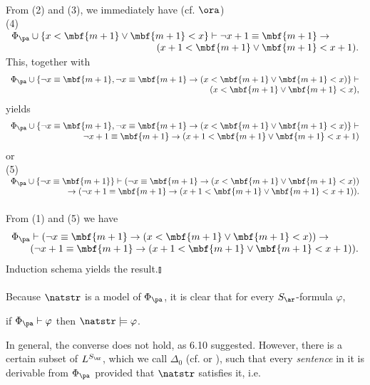 \ \\
From (2) and (3), we immediately have (cf. $\ora$)\\
(4)\hfill $\begin{array}{l}
\Phi_\pa \cup \{ x < \mbf{m + 1} \lor \mbf{m + 1} < x \} \vdash \neg x + 1 \equiv \mbf{m + 1} \rightarrow \ \ \ \ \ \ \ \ \ \cr
\multicolumn{1}{r}{(x + 1 < \mbf{m + 1} \lor \mbf{m + 1} < x + 1).}\end{array}$ \hfill \phantom{(4)}\\
This, together with
\[
\begin{array}{l}
\Phi_\pa \cup \{ \neg x \equiv \mbf{m + 1}, \neg x \equiv \mbf{m + 1} \rightarrow (x < \mbf{m + 1} \lor \mbf{m + 1} < x) \} \vdash \cr
\multicolumn{1}{r}{(x < \mbf{m + 1} \lor \mbf{m + 1} < x),}
\end{array}
\]
yields
\[
\begin{array}{l}
\Phi_\pa \cup \{ \neg x \equiv \mbf{m + 1}, \neg x \equiv \mbf{m + 1} \rightarrow (x < \mbf{m + 1} \lor \mbf{m + 1} < x) \} \vdash \cr
\multicolumn{1}{r}{\neg x + 1 \equiv \mbf{m + 1} \rightarrow (x + 1 < \mbf{m + 1} \lor \mbf{m + 1} < x + 1)}
\end{array}
\]
or\\
(5)\hfill $\begin{array}{l}
\Phi_\pa \cup \{ \neg x \equiv \mbf{m + 1} \} \vdash (\neg x \equiv \mbf{m + 1} \rightarrow (x < \mbf{m + 1} \lor \mbf{m + 1} < x)) \cr
\multicolumn{1}{r}{\rightarrow (\neg x + 1 \equiv \mbf{m + 1} \rightarrow (x + 1 < \mbf{m + 1} \lor \mbf{m + 1} < x + 1)).}\end{array}$\\
\ \\
From (1) and (5) we have
\[
\begin{array}{l}
\Phi_\pa \vdash (\neg x \equiv \mbf{m + 1} \rightarrow (x < \mbf{m + 1} \lor \mbf{m + 1} < x)) \rightarrow \ \ \ \ \ \ \ \ \ \cr
\multicolumn{1}{r}{(\neg x + 1 \equiv \mbf{m + 1} \rightarrow (x + 1 < \mbf{m + 1} \lor \mbf{m + 1} < x + 1)).}
\end{array}
\]
Induction schema yields the result.\nolinebreak\hfill$\talloblong$\\
\ \\
Because $\natstr$ is a model of $\Phi_\pa$, it is clear that for every $S_\ar$-formula $\varphi$,
\begin{center}
if $\Phi_\pa \vdash \varphi$ then $\natstr \models \varphi$.
\end{center}
In general, the converse does not hold, as 6.10 suggested. However, there is a certain subset of $L^{S_\ar}$, which we call $\Delta_0$ (cf. \cite{Dirk_van_Dalen} or \cite{Wolfgang_Rautenberg}), such that every \emph{sentence} in it is derivable from $\Phi_\pa$ provided that $\natstr$ satisfies it, i.e.
